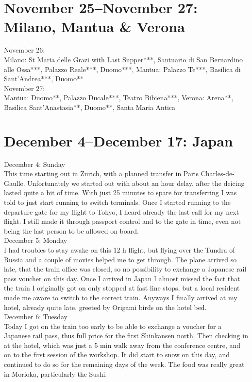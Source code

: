 \section{November 25--November 27: Milano, Mantua \& Verona}
\label{Milano2016}

November 26:\\
Milano: St Maria delle Grazi with Last Supper***, Santuario di San Bernardino alle Ossa***, Palazzo Reale***, Duomo***, Mantua: Palazzo Te***, Basilica di Sant'Andrea***, Duomo**\\

November 27:\\
Mantua: Duomo**, Palazzo Ducale***, Teatro Bibiena***, Verona: Arena**, Basilica Sant'Anastasia**, Duomo**, Santa Maria Antica

\section{December 4--December 17: Japan}
\label{Japan2016}

December 4: Sunday\\
This time starting out in Zurich, with a planned transfer in Paris Charles-de-Gaulle. Unfortunately we started out with about an hour delay, after the deicing lasted quite a bit of time. With just 25 minutes to spare for transferring I was told to just start running to switch terminals. Once I started running to the departure gate for my flight to Tokyo, I heard already the last call for my next flight. I still made it through passport control and to the gate in time, even not being the last person to be allowed on board.\\

December 5: Monday\\
I had troubles to stay awake on this 12 h flight, but flying over the Tundra of Russia and a couple of movies helped me to get through. The plane arrived so late, that the train office was closed, so no possibility to exchange a Japanese rail pass voucher on this day. Once I arrived in Japan I almost missed the fact that the train I originally got on only stopped at fast line stops, but a local resident made me aware to switch to the correct train. Anyways I finally arrived at my hotel, already quite late, greeted by Origami birds on the hotel bed.\\

December 6: Tuesday\\
Today I got on the train too early to be able to exchange a voucher for a Japanese rail pass, thus full price for the first Shinkansen north. Then checking in at the hotel, which was just a 5 min walk away from the conference centre, and on to the first session of the workshop. It did start to snow on this day, and continued to do so for the remaining days of the week. The food was really great in Morioka, particularly the Sushi.\\

